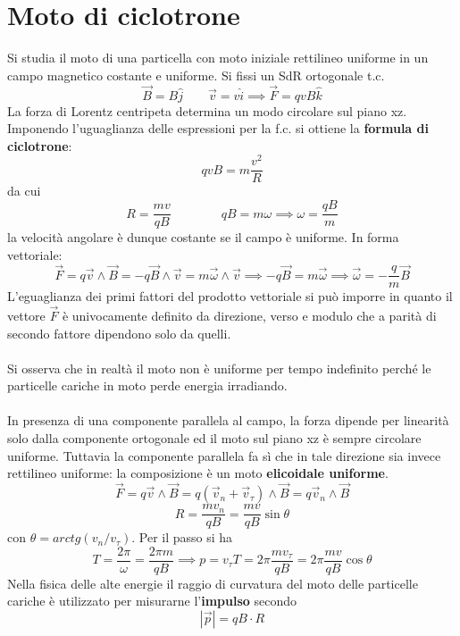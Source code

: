 \section{Moto di ciclotrone}
Si studia il moto di una particella con moto iniziale rettilineo uniforme in un campo magnetico costante e uniforme. Si fissi un SdR ortogonale t.c. 
\[\vec{B} = B \hat{j} \qquad \vec{v} = v \hat{i} \implies \vec{F} = qvB \hat{k}\]
La forza di Lorentz centripeta determina un modo circolare sul piano xz. Imponendo l'uguaglianza delle espressioni per la f.c. si ottiene la \textbf{formula di ciclotrone}:
\[qvB = m \frac{v^2}{R}\]
da cui
\[R = \frac{mv}{qB} \qquad \qquad qB = m \omega \implies \omega = \frac{qB}{m}\]
la velocità angolare è dunque costante se il campo è uniforme. In forma vettoriale:
\[\vec{F} = q \vec{v} \wedge \vec{B} = - q \vec{B} \wedge \vec{v} = m \vec{\omega} \wedge \vec{v} \implies - q \vec{B} = m \vec{\omega} \implies \vec{\omega} = - \frac{q}{m} \vec{B}\]
L'eguaglianza dei primi fattori del prodotto vettoriale si può imporre in quanto il vettore $\vec{F}$ è univocamente definito da direzione, verso e modulo che a parità di secondo fattore dipendono solo da quelli.
\\~\\
Si osserva che in realtà il moto non è uniforme per tempo indefinito perché le particelle cariche in moto perde energia irradiando.
\\~\\
In presenza di una componente parallela al campo, la forza dipende per linearità solo dalla componente ortogonale ed il moto sul piano xz è sempre circolare uniforme. Tuttavia la componente parallela fa sì che in tale direzione sia invece rettilineo uniforme: la composizione è un moto \textbf{elicoidale uniforme}.
\[\vec{F} = q \vec{v} \wedge \vec{B} = q (\vec{v}_n + \vec{v}_\tau) \wedge \vec{B} = q \vec{v}_n \wedge \vec{B}\]
\[R = \frac{m v_n}{qB} = \frac{m v}{qB} \sin \theta\]
con $\theta = arctg(v_n/v_\tau)$. Per il passo si ha
\[T = \frac{2\pi}{\omega} = \frac{2\pi m}{q B} \implies p = v_\tau T = 2\pi \frac{m v_\tau}{qB} = 2 \pi \frac{m v}{qB} \cos \theta\]
Nella fisica delle alte energie il raggio di curvatura del moto delle particelle cariche è utilizzato per misurarne l'\textbf{impulso} secondo
\[|\vec{p}| = q B \cdot R\]

